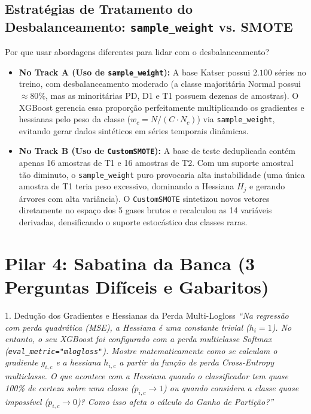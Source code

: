\documentclass[11pt,a4paper]{article}
\begin{document}
\subsection{Estratégias de Tratamento do Desbalanceamento: \texttt{sample\_weight} vs. SMOTE}
\begin{decisionBox}{Por que usar abordagens diferentes para lidar com o desbalanceamento?}
\begin{itemize}
  \item \textbf{No Track A (Uso de \texttt{sample\_weight}):} A base Katser possui $2.100$ séries no treino, com desbalanceamento moderado (a classe majoritária Normal possui $\approx 80\%$, mas as minoritárias PD, D1 e T1 possuem dezenas de amostras). O XGBoost gerencia essa proporção perfeitamente multiplicando os gradientes e hessianas pelo peso da classe ($w_c = N / (C \cdot N_c)$) via \texttt{sample\_weight}, evitando gerar dados sintéticos em séries temporais dinâmicas.
  \item \textbf{No Track B (Uso de \texttt{CustomSMOTE}):} A base de teste deduplicada contém apenas 16 amostras de T1 e 16 amostras de T2. Com um suporte amostral tão diminuto, o \texttt{sample\_weight} puro provocaria alta instabilidade (uma única amostra de T1 teria peso excessivo, dominando a Hessiana $H_j$ e gerando árvores com alta variância). O \texttt{CustomSMOTE} sintetizou novos vetores diretamente no espaço dos 5 gases brutos e recalculou as 14 variáveis derivadas, densificando o suporte estocástico das classes raras.
\end{itemize}
\end{decisionBox}

\vspace{0.4cm}
\section{Pilar 4: Sabatina da Banca (3 Perguntas Difíceis e Gabaritos)}

\begin{boardQuestion}{1. Dedução dos Gradientes e Hessianas da Perda Multi-Logloss}
\textit{“Na regressão com perda quadrática (MSE), a Hessiana é uma constante trivial ($h_i = 1$). No entanto, o seu XGBoost foi configurado com a perda multiclasse Softmax (\texttt{eval\_metric="mlogloss"}). Mostre matematicamente como se calculam o gradiente $g_{i, c}$ e a hessiana $h_{i, c}$ a partir da função de perda Cross-Entropy multiclasse. O que acontece com a Hessiana quando o classificador tem quase 100\% de certeza sobre uma classe ($p_{i, c} \to 1$) ou quando considera a classe quase impossível ($p_{i, c} \to 0$)? Como isso afeta o cálculo do Ganho de Partição?”}
\end{boardQuestion}
\end{document}
